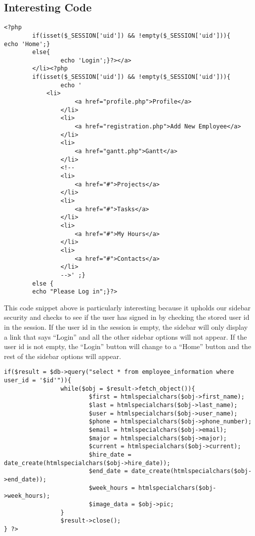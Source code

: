 \documentclass[letterpaper,10pt,titlepage,journal,compsoc,draftclsnofoot,onecolumn]{IEEEtran}
\newcommand\tab[1][1cm]{\hspace*{#1}}
\begin{document}
\subsection{Interesting Code}

\lstset{language=PHP, showstringspaces=false}
\begin{lstlisting}
<?php
     	if(isset($_SESSION['uid']) && !empty($_SESSION['uid'])){             	
echo 'Home';}
     	else{
             	echo 'Login';}?></a>
    	</li><?php
     	if(isset($_SESSION['uid']) && !empty($_SESSION['uid'])){
             	echo '
          	<li>
                	<a href="profile.php">Profile</a>
            	</li>
            	<li>
                	<a href="registration.php">Add New Employee</a>
            	</li>
            	<li>
                	<a href="gantt.php">Gantt</a>
            	</li>
             	<!--
            	<li>
                	<a href="#">Projects</a>
            	</li>
            	<li>
                	<a href="#">Tasks</a>
            	</li>
            	<li>
                	<a href="#">My Hours</a>
            	</li>
            	<li>
                	<a href="#">Contacts</a>
            	</li>
             	-->' ;}
     	else {
  		echo "Please Log in";}?>

\end{lstlisting}


\tab
This code snippet above is particularly interesting because it upholds our sidebar security and checks to see if the user has signed in by checking the stored user id in the session. If the user id in the session is empty, the sidebar will only display a link that says “Login” and all the other sidebar options will not appear. If the user id is not empty, the “Login” button will change to a “Home” button and the rest of the sidebar options will appear.
\newline

\lstset{language=PHP, showstringspaces=false}
\begin{lstlisting}
if($result = $db->query("select * from employee_information where user_id = '$id'")){
             	while($obj = $result->fetch_object()){
             	     	$first = htmlspecialchars($obj->first_name);
                      	$last = htmlspecialchars($obj->last_name);
                      	$user = htmlspecialchars($obj->user_name);
                      	$phone = htmlspecialchars($obj->phone_number);
                      	$email = htmlspecialchars($obj->email);
                      	$major = htmlspecialchars($obj->major);
                      	$current = htmlspecialchars($obj->current);
                      	$hire_date = date_create(htmlspecialchars($obj->hire_date));
                      	$end_date = date_create(htmlspecialchars($obj->end_date));
                      	$week_hours = htmlspecialchars($obj->week_hours);
                      	$image_data = $obj->pic;
             	}
             	$result->close();
} ?>

\end{lstlisting}
\end{document}
